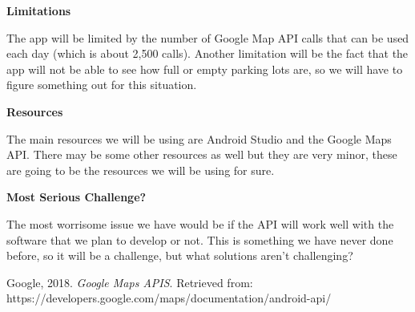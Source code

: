 \documentclass[12pt]{article}
\begin{document}
	
	\begin{flushleft}
		\textbf{Limitations}
	\end{flushleft}
	
	The app will be limited by the number of Google Map API calls that can be used each day (which is about 2,500 calls).  Another limitation will be the fact that the app will not be able to see how full or empty parking lots are, so we will have to figure something out for this situation. \\
	
	
	\begin{flushleft}
		\textbf{Resources}
	\end{flushleft}

	The main resources we will be using are Android Studio and the Google Maps API.  There may be some other resources as well but they are very minor, these are going to be the resources we will be using for sure. \\
	
	
	\begin{flushleft}
		\textbf{Most Serious Challenge?}
	\end{flushleft}

	The most worrisome issue we have would be if the API will work well with the software that we plan to develop or not.  This is something we have never done before, so it will be a challenge, but what solutions aren't challenging?
	
	
	
	Google, 2018.  \textit{Google Maps APIS}. \quad  Retrieved from: \\ https://developers.google.com/maps/documentation/android-api/
\end{document}
